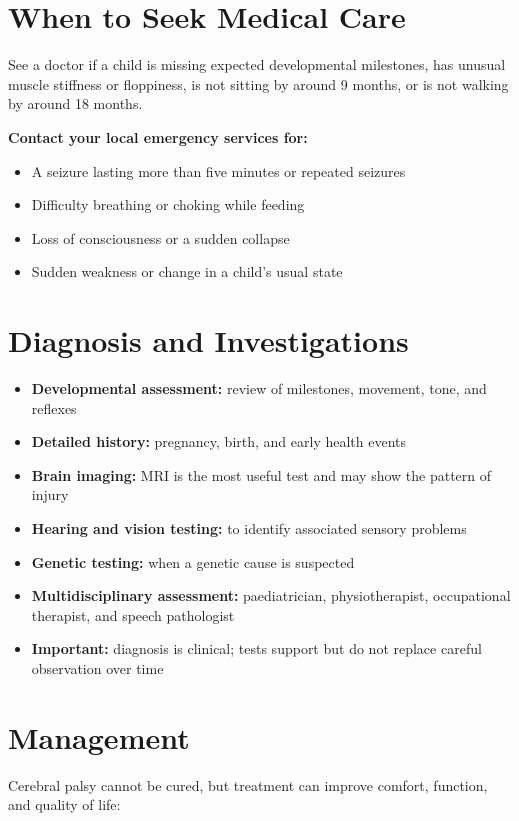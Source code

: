 \section*{When to Seek Medical Care}
See a doctor if a child is missing expected developmental milestones, has unusual muscle stiffness or floppiness, is not sitting by around 9 months, or is not walking by around 18 months.

\textbf{Contact your local emergency services for:}
\begin{itemize}
    \item A seizure lasting more than five minutes or repeated seizures
    \item Difficulty breathing or choking while feeding
    \item Loss of consciousness or a sudden collapse
    \item Sudden weakness or change in a child's usual state
\end{itemize}

\section*{Diagnosis and Investigations}
\begin{itemize}
    \item \textbf{Developmental assessment:} review of milestones, movement, tone, and reflexes
    \item \textbf{Detailed history:} pregnancy, birth, and early health events
    \item \textbf{Brain imaging:} MRI is the most useful test and may show the pattern of injury
    \item \textbf{Hearing and vision testing:} to identify associated sensory problems
    \item \textbf{Genetic testing:} when a genetic cause is suspected
    \item \textbf{Multidisciplinary assessment:} paediatrician, physiotherapist, occupational therapist, and speech pathologist
    \item \textbf{Important:} diagnosis is clinical; tests support but do not replace careful observation over time
\end{itemize}

\section*{Management}
Cerebral palsy cannot be cured, but treatment can improve comfort, function, and quality of life:


